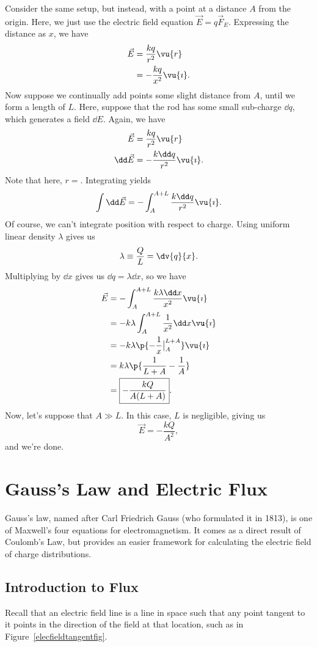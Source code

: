 \documentclass[11pt]{article}
\begin{document}
\begin{solution}
	Consider the same setup, but instead, with a point at a distance $A$ from the origin. Here, we just use the electric field equation $\vec{E} = q\vec{F}_E$. Expressing the distance as $x$, we have
	\begin{align*}
		\vec{E} &= \frac{kq}{r^2}\vu{r} \\
		&= -\frac{kq}{x^2}\vu{\imath}.
	\end{align*}
	Now suppose we continually add points some slight distance from $A$, until we form a length of $L$. Here, suppose that the rod has some small sub-charge $\dd q$, which generates a field $\dd E$. Again, we have
	\begin{align*}
		\vec{E} &= \frac{kq}{r^2}\vu{r} \\
		\dd\vec{E} &= -\frac{k\dd q}{r^2}\vu{\imath}.	
	\end{align*}
	Note that here, $r = $. Integrating yields
	\begin{equation*}
		\int \dd \vec{E} = -\int_{A}^{A+L} \frac{k\dd q}{r^2}\vu{\imath}.
	\end{equation*}
	Of course, we can't integrate position with respect to charge. Using uniform linear density $\lambda$ gives us
	\[\lambda \equiv \frac{Q}{L} = \dv{q}{x}.\]
	Multiplying by $\dd x$ gives us $\dd q = \lambda\dd x$, so we have
	\begin{align*}
		\vec{E} &= -\int_A^{A+L} \frac{k\lambda\dd x}{x^2}\vu{\imath} \\
		&= -k\lambda \int_A^{A+L} \frac{1}{x^2}\dd x \vu{\imath} \\
		&= -k\lambda\p{-\frac{1}{x}\big|_{A}^{L+A}}\vu{\imath} \\
		&= k\lambda\p{\frac{1}{L+A} - \frac{1}{A}} \\
		&= \boxed{-\frac{kQ}{A(L+A)}}.
	\end{align*}
	Now, let's suppose that $A \gg L$. In this case, $L$ is negligible, giving us
	\[\vec{E} = -\frac{kQ}{A^2},\]
	and we're done.
\end{solution}
\section{Gauss's Law and Electric Flux}
Gauss's law, named after Carl Friedrich Gauss (who formulated it in 1813), is one of Maxwell's four equations for electromagnetism. It comes as a direct result of Coulomb's Law, but provides an easier framework for calculating the electric field of charge distributions.
\subsection{Introduction to Flux}
Recall that an electric field line is a line in space such that any point tangent to it points in the direction of the field at that location, such as in Figure~\ref{elecfieldtangentfig}.
\end{document}
